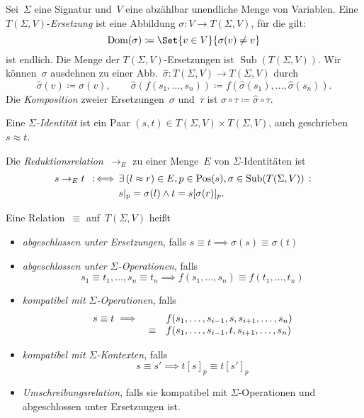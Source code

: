 \documentclass{cheat-sheet}
\DeclareMathOperator{\Pos}{Pos} %
\DeclareMathOperator{\Dom}{Dom} %
\DeclareMathOperator{\Subst}{Sub} %
\newcommand{\ident}{\approx} %
\begin{document}
\begin{defn}
  Sei~$\Sigma$ eine Signatur und~$V$ eine abzählbar unendliche Menge von Variablen.
  Eine $T(\Sigma, V)$-\emph{Ersetzung} ist eine Abbildung $\sigma : V \to T(\Sigma, V)$, für die gilt:
  \[
    \Dom(\sigma) \coloneqq \Set{v \in V}{\sigma(v) \neq v}
  \]
  ist endlich.
  Die Menge der $T(\Sigma, V)$-Ersetzungen ist $\Subst(T(\Sigma, V))$.
  Wir können~$\sigma$ ausdehnen zu einer Abb.~$\hat{\sigma} : T(\Sigma, V) \to T(\Sigma, V)$ durch
  \[
    \hat{\sigma}(v) \coloneqq \sigma(v), \qquad
    \hat{\sigma}(f(s_1, \ldots, s_n)) \coloneqq f(\hat{\sigma}(s_1), \ldots, \hat{\sigma}(s_n)).
  \]
  Die \textit{Komposition} zweier Ersetzungen~$\sigma$ und~$\tau$ ist $\sigma \circ \tau \coloneqq \hat{\sigma} \circ \tau$.
\end{defn}

\begin{defn}
  Eine \emph{$\Sigma$-Identität} ist ein Paar $(s, t) \in T(\Sigma, V) \times T(\Sigma, V)$, auch geschrieben $s \ident t$.
\end{defn}

\begin{defn}
  Die \emph{Reduktionsrelation}~$\to_E$ zu einer Menge~$E$ von $\Sigma$-Identitäten ist
  \begin{align*}
    s \to_E t \coloniff \, & \ex{(l \ident r) \in E, p \in \Pos(s), \sigma \in \Subst(T(\Sigma, V))} \\
    & s|_p = \sigma(l) \wedge t = s[\sigma(r)]_p.
  \end{align*}
\end{defn}

\begin{defn}
  Eine Relation~$\equiv$ auf~$T(\Sigma, V)$ heißt
  \begin{itemize}
    \item \emph{abgeschlossen unter Ersetzungen}, falls $s \equiv t \implies \sigma(s) \equiv \sigma(t)$
    \item \emph{abgeschlossen unter $\Sigma$-Operationen}, falls
    \[
      s_1 \equiv t_1, \ldots, s_n \equiv t_n \implies f(s_1, \ldots, s_n) \equiv f(t_1, \ldots, t_n)
    \]
    \item \emph{kompatibel mit $\Sigma$-Operationen}, falls
    \[
      \begin{array}{r c l}
        s \equiv t \implies &&
        f(s_1, \ldots, s_{i-1}, s, s_{i+1}, \ldots, s_n) \\
        &\equiv& f(s_1, \ldots, s_{i-1}, t, s_{i+1}, \ldots, s_n)
      \end{array}
    \]
    \item \emph{kompatibel mit $\Sigma$-Kontexten}, falls
    \[
      s \equiv s' \implies t[s]_p \equiv t[s']_p
    \]
    \item \emph{Umschreibungsrelation}, falls sie kompatibel mit $\Sigma$-Operationen und abgeschlossen unter Ersetzungen ist.
  \end{itemize}
\end{defn}
\end{document}
